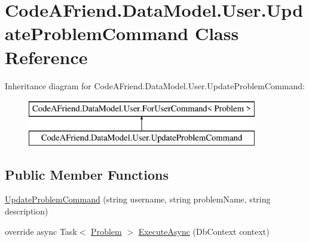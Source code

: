 \hypertarget{class_code_a_friend_1_1_data_model_1_1_user_1_1_update_problem_command}{}\section{Code\+A\+Friend.\+Data\+Model.\+User.\+Update\+Problem\+Command Class Reference}
\label{class_code_a_friend_1_1_data_model_1_1_user_1_1_update_problem_command}


 


Inheritance diagram for Code\+A\+Friend.\+Data\+Model.\+User.\+Update\+Problem\+Command\+:\begin{figure}[H]
\begin{center}
\leavevmode
\includegraphics[height=2.000000cm]{class_code_a_friend_1_1_data_model_1_1_user_1_1_update_problem_command}
\end{center}
\end{figure}
\subsection*{Public Member Functions}
\begin{DoxyCompactItemize}
\item 
\mbox{\hyperlink{class_code_a_friend_1_1_data_model_1_1_user_1_1_update_problem_command_ab479f2e60c03c69f054422fba29c4879}{Update\+Problem\+Command}} (string username, string problem\+Name, string description)
\item 
override async Task$<$ \mbox{\hyperlink{class_code_a_friend_1_1_data_model_1_1_problem}{Problem}} $>$ \mbox{\hyperlink{class_code_a_friend_1_1_data_model_1_1_user_1_1_update_problem_command_ab6deb9c81098f15347a52cff94661c4b}{Execute\+Async}} (Db\+Context context)
\end{DoxyCompactItemize}

